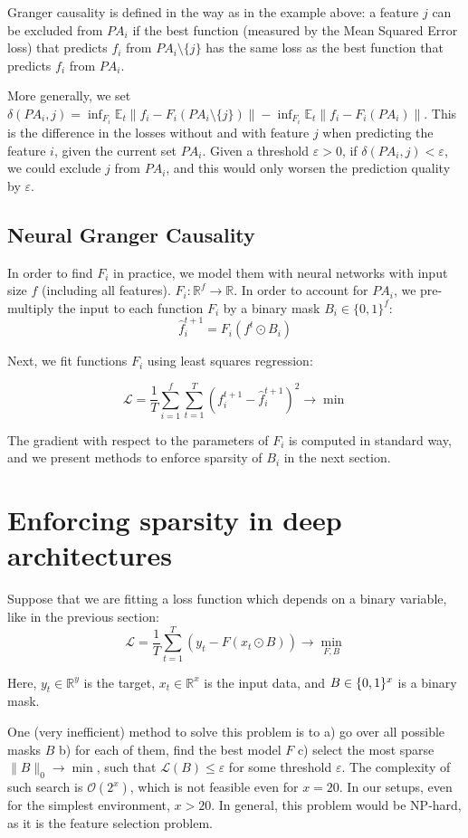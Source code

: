 \documentclass[a4paper,11pt,oneside]{report}
\begin{document}
Granger causality \cite{Barnett2015} is defined in the way as in the example above: a feature $j$ can be excluded from $PA_i$ if the best function (measured by the Mean Squared Error loss) that predicts $f_i$ from $PA_i\setminus\{j\}$ has the same loss as the best function that predicts $f_i$ from $PA_i$.

More generally, we set $\delta(PA_i,j)=\inf_{F_i}\mathbb E_t\|f_i-F_i(PA_i\setminus\{j\})\|-\inf_{F_i}\mathbb E_t\|f_i-F_i(PA_i)\|$. This is the difference in the losses without and with feature $j$ when predicting the feature $i$, given the current set $PA_i$.
Given a threshold $\varepsilon>0$, if $\delta(PA_i,j)<\varepsilon$, we could exclude $j$ from $PA_i$, and this would only worsen the prediction quality by $\varepsilon$.

\subsection{Neural Granger Causality}
\label{subsec:neural_granger}
In order to find $F_i$ in practice, we model them with neural networks \cite{Tank2018} with input size $f$ (including all features). $F_i\colon \mathbb R^{f}\to\mathbb R$. In order to account for $PA_i$, we pre-multiply the input to each function $F_i$ by a binary mask $B_i\in\{0,1\}^f$:
$$
\hat{f}_i^{t+1}=F_i(f^t\odot B_i)
$$

Next, we fit functions $F_i$ using least squares regression:

$$
\mathcal L=\frac{1}{T}\sum\limits_{i=1}^f\sum\limits_{t=1}^T \left(f^{t+1}_i-\hat{f}_i^{t+1}\right)^2\to\min
$$

The gradient with respect to the parameters of $F_i$ is computed in standard way, and we present methods to enforce sparsity of $B_i$ in the next section.

\section{Enforcing sparsity in deep architectures}
\label{sec:sparse_deep}
Suppose that we are fitting a loss function which depends on a binary variable, like in the previous section:
$$
\mathcal L=\frac{1}{T}\sum\limits_{t=1}^T(y_t-F(x_t\odot B))\to\min\limits_{F,B}
$$

Here, $y_t\in\mathbb R^y$ is the target, $x_t\in\mathbb R^x$ is the input data, and $B\in\mathbb \{0,1\}^x$ is a binary mask.

One (very inefficient) method to solve this problem is to a) go over all possible masks $B$ b) for each of them, find the best model $F$ c) select the most sparse $\|B\|_0\to\min$, such that $\mathcal L(B)\leq\varepsilon$ for some threshold $\varepsilon$. The complexity of such search is $\mathcal O(2^x)$, which is not feasible even for $x=20$. In our setups, even for the simplest environment, $x>20$. In general, this problem would be NP-hard, as it is the feature selection problem.
\end{document}
